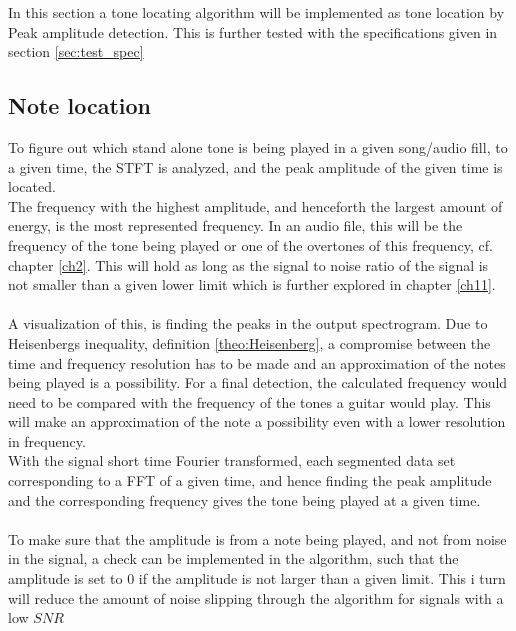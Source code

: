 \label{sec:peak_detection}
In this section a tone locating algorithm will be implemented as tone location by Peak amplitude detection.
This is further tested with the specifications given in section \ref{sec:test_spec}
\subsection{Note location}
To figure out which stand alone tone is being played in a given song/audio fill, to a given time, the STFT is analyzed, and the peak amplitude of the given time is located.\\
The frequency with the highest amplitude, and henceforth the largest amount of energy, is the most represented frequency. 
In an audio file, this will be the frequency of the tone being played or one of the overtones of this frequency, cf. chapter \ref{ch2}.
This will hold as long as the signal to noise ratio of the signal is not smaller than a given lower limit which is further explored in chapter \ref{ch11}.
\\
\\
A visualization of this, is finding the peaks in the output spectrogram.
Due to Heisenbergs inequality, definition \ref{theo:Heisenberg}, a compromise between the time and frequency resolution has to be made and an approximation of the notes being played is a possibility.
For a final detection, the calculated frequency would need to be compared with the frequency of the tones a guitar would play. 
This will make an approximation of the note a possibility even with a lower resolution in frequency.
\\
With the signal short time Fourier transformed, each segmented data set corresponding to a FFT of a given time, and hence finding the peak amplitude and the corresponding frequency gives the tone being played at a given time.
\\\\
To make sure that the amplitude is from a note being played, and not from noise in the signal, a check can be implemented in the algorithm, such that the amplitude is set to $0$ if the amplitude is not larger than a given limit.
This i turn will reduce the amount of noise slipping through the algorithm for signals with a low $SNR$


